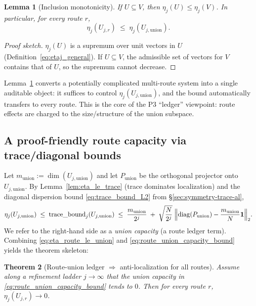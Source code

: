 \documentclass[11pt]{article}
\theoremstyle{plain}
\newtheorem{theorem}{Theorem}[section]
\newtheorem{lemma}[theorem]{Lemma}
\theoremstyle{definition}
\theoremstyle{remark}
\begin{document}
\begin{lemma}[Inclusion monotonicity]\label{lem:route_inclusion_monotonicity}
If \(U \subseteq V\), then \(\eta_j(U) \le \eta_j(V)\).
In particular, for every route \(r\),
\begin{equation}\label{eq:eta_route_le_union}
\eta_j(U_{j,r}) \;\le\; \eta_j(U_{j,\mathrm{union}}).
\end{equation}
\end{lemma}

\begin{proof}[Proof sketch]
\(\eta_j(U)\) is a supremum over unit vectors in \(U\) (Definition~\eqref{eq:etaj_general}).
If \(U\subseteq V\), the admissible set of vectors for \(V\) contains that of \(U\), so the supremum cannot decrease.
\end{proof}

Lemma~\ref{lem:route_inclusion_monotonicity} converts a potentially complicated multi-route system into a single auditable object:
it suffices to control \(\eta_j(U_{j,\mathrm{union}})\), and the bound automatically transfers to every route.
This is the core of the P3 ``ledger'' viewpoint: route effects are charged to the size/structure of the union subspace.

\subsection{A proof-friendly route capacity via trace/diagonal bounds}\label{subsec:route_capacity}

Let \(m_{\mathrm{union}} := \dim(U_{j,\mathrm{union}})\) and let \(P_{\mathrm{union}}\) be the orthogonal projector onto \(U_{j,\mathrm{union}}\).
By Lemma~\ref{lem:eta_le_trace} (trace dominates localization) and the diagonal dispersion bound \eqref{eq:trace_bound_L2} from \S\ref{sec:symmetry-trace-al},
\begin{equation}\label{eq:route_union_capacity_bound}
\eta_j(U_{j,\mathrm{union}})
\;\le\;
\mathrm{trace\_bound}_j(U_{j,\mathrm{union}})
\;\le\;
\frac{m_{\mathrm{union}}}{2^j}
\;+\;
\sqrt{\frac{N}{2^j}}\;\Bigl\|\mathrm{diag}(P_{\mathrm{union}}) - \frac{m_{\mathrm{union}}}{N}\mathbf{1}\Bigr\|_2.
\end{equation}
We refer to the right-hand side as a \emph{union capacity} (a route ledger term).
Combining \eqref{eq:eta_route_le_union} and \eqref{eq:route_union_capacity_bound} yields the theorem skeleton:

\begin{theorem}[Route-union ledger \(\Rightarrow\) anti-localization for all routes]\label{thm:route_union_ledger_AL}
Assume along a refinement ladder \(j\to\infty\) that the union capacity in \eqref{eq:route_union_capacity_bound} tends to \(0\).
Then for every route \(r\), \(\eta_j(U_{j,r}) \to 0\).
\end{theorem}
\end{document}
